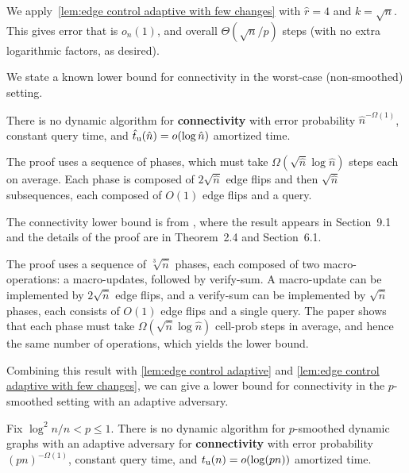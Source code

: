 \documentclass[letter,11pt]{article}
\newcommand{\tu}{t_{\textnormal{u}}}
\begin{document}
We apply~\cref{lem:edge control adaptive with few changes} with $\hat{r} = 4$ and $k = \sqrt{n}$.
This gives error that is $o_n(1)$, and overall $\Theta\left(\sqrt{n}/p\right)$ steps (with no extra logarithmic factors, as desired).

We state a known lower bound for connectivity in the worst-case (non-smoothed) setting. 
\begin{lemma}
	\label{lem:lb for connectivity-original}
	There is no dynamic algorithm for 
	\textbf{connectivity}
	with error probability $\hat n^{-\Omega(1)}$,
	constant query time,
	and 
	$\hat\tu(\hat n)=o(\log \hat n)$
	amortized time.
	
	The proof uses a sequence of phases,
	which must take $\Omega(\sqrt{\hat n}\log\hat n)$ steps each on average.
	Each phase is composed of 
	$2\sqrt{\hat n}$ edge flips
	and then 
	$\sqrt{\hat n}$
	subsequences, each composed of $O(1)$ edge flips and a query.
\end{lemma}

The connectivity lower bound is from \cite{PatrascuD06}, 
where the result appears in Section~9.1 and the details of the proof are in Theorem~2.4 and Section~6.1.

The proof uses a sequence of $\sqrt[3]{\hat n}$ phases,
each composed of two macro-operations:
a macro-updates, followed by verify-sum.
A macro-update can be implemented by $2\sqrt{\hat n}$ edge flips, 
and a verify-sum can be implemented by 
$\sqrt{\hat n}$ phases, each consists of $O(1)$ edge flips and a single query.
%
The paper shows that each phase must take $\Omega(\sqrt{\hat n}\log {\hat n})$ cell-prob steps in average, 
and hence the same number of operations,
which yields the lower bound.


Combining this result with \cref{lem:edge control adaptive} and \cref{lem:edge control adaptive with few changes}, we can give a lower bound for connectivity in the $p$-smoothed setting with an adaptive adversary.

\begin{theorem}
	\label{thm:lb for connectivity-smoothed advers}
	Fix $\log^2n/n < p \leq 1$. 
	There is no dynamic algorithm for
	$p$-smoothed dynamic graphs with an adaptive adversary
	for 
	\textbf{connectivity}
	with error probability $(pn)^{-\Omega(1)}$,
	constant query time,
	and 
	$\tu(n)=o(\log(p n))$
	amortized time.
\end{theorem}
\end{document}
